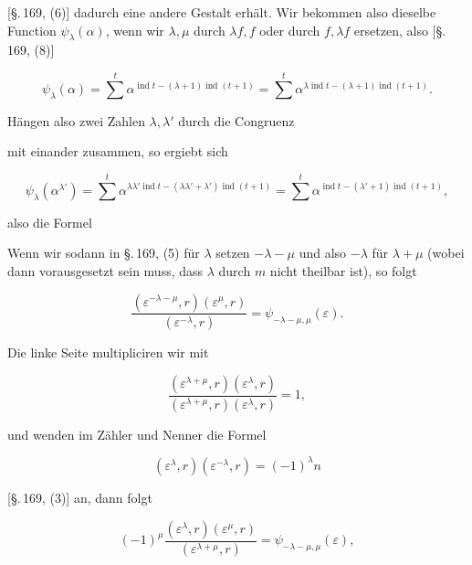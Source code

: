[\S.\,169, (6)] dadurch eine andere Gestalt erhält. Wir bekommen
also dieselbe Function $\psi_\lambda(\alpha)$, wenn wir $\lambda,\mu$ durch $\lambda f, f$ oder
durch $f, \lambda f$ ersetzen, also [\S.\,169, (8)]

\[
\psi_\lambda(\alpha) = \sum^{t} \alpha^{\operatorname{ind} t - (\lambda+1)\operatorname{ind}(t+1)}
= \sum^{t} \alpha^{\lambda \operatorname{ind} t - (\lambda+1)\operatorname{ind}(t+1)}.
\]

Hängen also zwei Zahlen $\lambda,\lambda'$ durch die Congruenz


mit einander zusammen, so ergiebt sich

\[
\psi_\lambda(\alpha^{\lambda'}) = \sum^{t} \alpha^{\lambda\lambda' \operatorname{ind} t - (\lambda\lambda'+\lambda')\operatorname{ind}(t+1)}
= \sum^{t} \alpha^{\operatorname{ind} t - (\lambda'+1)\operatorname{ind}(t+1)},
\]

also die Formel


Wenn wir sodann in \S.\,169, (5) für $\lambda$ setzen $-\lambda-\mu$ und
also $-\lambda$ für $\lambda+\mu$ (wobei dann vorausgesetzt sein muss, dass
$\lambda$ durch $m$ nicht theilbar ist), so folgt

\[
\frac{(\varepsilon^{-\lambda-\mu}, r)(\varepsilon^\mu, r)}{(\varepsilon^{-\lambda}, r)} = \psi_{-\lambda-\mu,\mu}(\varepsilon).
\]

Die linke Seite multipliciren wir mit

\[
\frac{(\varepsilon^{\lambda+\mu}, r)(\varepsilon^\lambda, r)}{(\varepsilon^{\lambda+\mu}, r)(\varepsilon^\lambda, r)} = 1,
\]

und wenden im Zähler und Nenner die Formel

\[
(\varepsilon^\lambda, r)(\varepsilon^{-\lambda}, r) = (-1)^\lambda n
\]

[\S.\,169, (3)] an, dann folgt

\[
(-1)^\mu \frac{(\varepsilon^\lambda, r)(\varepsilon^\mu, r)}{(\varepsilon^{\lambda+\mu}, r)} = \psi_{-\lambda-\mu,\mu}(\varepsilon),
\]

